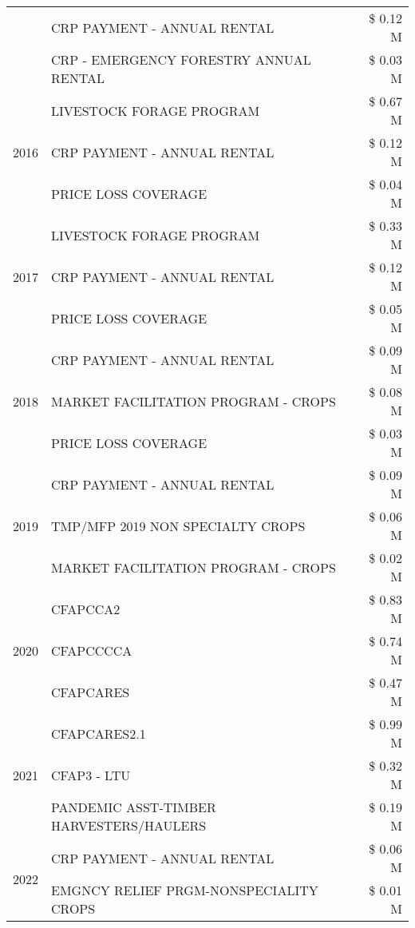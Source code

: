 \begin{tabular}{llr}
 & CRP PAYMENT - ANNUAL RENTAL & \$ 0.12 M \\
 & CRP - EMERGENCY FORESTRY ANNUAL RENTAL & \$ 0.03 M \\
\cline{1-3}
\multirow[t]{3}{*}{2016} & LIVESTOCK FORAGE PROGRAM & \$ 0.67 M \\
 & CRP PAYMENT - ANNUAL RENTAL & \$ 0.12 M \\
 & PRICE LOSS COVERAGE & \$ 0.04 M \\
\cline{1-3}
\multirow[t]{3}{*}{2017} & LIVESTOCK FORAGE PROGRAM & \$ 0.33 M \\
 & CRP PAYMENT - ANNUAL RENTAL & \$ 0.12 M \\
 & PRICE LOSS COVERAGE & \$ 0.05 M \\
\cline{1-3}
\multirow[t]{3}{*}{2018} & CRP PAYMENT - ANNUAL RENTAL & \$ 0.09 M \\
 & MARKET FACILITATION PROGRAM - CROPS & \$ 0.08 M \\
 & PRICE LOSS COVERAGE & \$ 0.03 M \\
\cline{1-3}
\multirow[t]{3}{*}{2019} & CRP PAYMENT - ANNUAL RENTAL & \$ 0.09 M \\
 & TMP/MFP 2019 NON SPECIALTY CROPS & \$ 0.06 M \\
 & MARKET FACILITATION PROGRAM - CROPS & \$ 0.02 M \\
\cline{1-3}
\multirow[t]{3}{*}{2020} & CFAPCCA2 & \$ 0.83 M \\
 & CFAPCCCCA & \$ 0.74 M \\
 & CFAPCARES & \$ 0.47 M \\
\cline{1-3}
\multirow[t]{3}{*}{2021} & CFAPCARES2.1 & \$ 0.99 M \\
 & CFAP3 - LTU & \$ 0.32 M \\
 & PANDEMIC ASST-TIMBER HARVESTERS/HAULERS & \$ 0.19 M \\
\cline{1-3}
\multirow[t]{2}{*}{2022} & CRP PAYMENT - ANNUAL RENTAL & \$ 0.06 M \\
 & EMGNCY RELIEF PRGM-NONSPECIALITY CROPS & \$ 0.01 M \\
\cline{1-3}
\bottomrule
\end{tabular}
